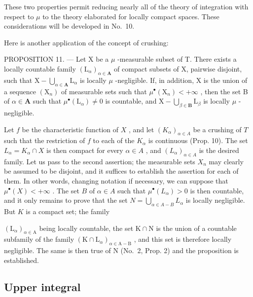 These two properties permit reducing nearly all of the theory of integration with respect to \(\mu\) to the theory elaborated for locally compact spaces. These considerations will be developed in No.~10.

Here is another application of the concept of crushing:

PROPOSITION 11. --- Let X be a \(\mu\) -measurable subset of T. There exists a locally countable family \((\mathrm{L}_{\alpha})_{\alpha \in \mathbf{A}}\) of compact subsets of X, pairwise disjoint, such that \(\mathrm{X} - \bigcup_{\alpha \in \mathbf{A}} \mathrm{L}_{\alpha}\) is locally \(\mu\) -negligible. If, in addition, X is the union of a sequence \((\mathrm{X}_n)\) of measurable sets such that \(\mu^{\bullet}(\mathrm{X}_n) < +\infty\) , then the set B of \(\alpha \in \mathbf{A}\) such that \(\mu^{\bullet}(\mathrm{L}_{\alpha}) \neq 0\) is countable, and \(\mathrm{X} - \bigcup_{\beta \in \mathbf{B}} \mathrm{L}_{\beta}\) is locally \(\mu\) -negligible.

Let \(f\) be the characteristic function of \(X\) , and let \((K_{\alpha})_{\alpha \in A}\) be a crushing of \(T\) such that the restriction of \(f\) to each of the \(K_{\alpha}\) is continuous (Prop. 10). The set \(L_{\alpha} = K_{\alpha} \cap X\) is then compact for every \(\alpha \in A\) , and \((L_{\alpha})_{\alpha \in A}\) is the desired family. Let us pass to the second assertion; the measurable sets \(X_{n}\) may clearly be assumed to be disjoint, and it suffices to establish the assertion for each of them. In other words, changing notation if necessary, we can suppose that \(\mu^{\bullet}(X) < +\infty\) . The set \(B\) of \(\alpha \in A\) such that \(\mu^{\bullet}(L_{\alpha}) > 0\) is then countable, and it only remains to prove that the set \(N = \bigcup_{\alpha \in A - B} L_{\alpha}\) is locally negligible. But \(K\) is a compact set; the family

\((\mathrm{L}_{\alpha})_{\alpha\in\mathrm{A}}\) being locally countable, the set \(\mathrm{K}\cap\mathrm{N}\) is the union of a countable subfamily of the family \((\mathrm{K}\cap\mathrm{L}_{\alpha})_{\alpha\in\mathrm{A}-\mathrm{B}}\) , and this set is therefore locally negligible. The same is then true of \(\mathrm{N}\) (No.~2, Prop. 2) and the proposition is established.

\subsection{Upper integral}

